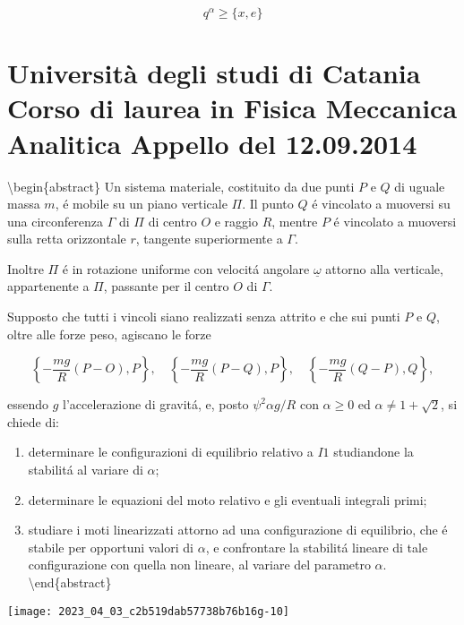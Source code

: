 \documentclass[10pt]{article}
\begin{document}
\[
q^{\alpha} \geq\{x, e\}
\]

\section*{Università degli studi di Catania 
 Corso di laurea in Fisica 
 Meccanica Analitica 
 Appello del 12.09.2014 }
\textbackslash begin\{abstract\}
Un sistema materiale, costituito da due punti \(P\) e \(Q\) di uguale massa \(m\), é mobile su un piano verticale \(\Pi\). Il punto \(Q\) é vincolato a muoversi su una circonferenza \(\Gamma\) di \(\Pi\) di centro \(O\) e raggio \(R\), mentre \(P\) é vincolato a muoversi sulla retta orizzontale \(r\), tangente superiormente a \(\Gamma\).

Inoltre \(\Pi\) é in rotazione uniforme con velocitá angolare \(\underline{\omega}\) attorno alla verticale, appartenente a \(\Pi\), passante per il centro \(O\) di \(\Gamma\).

Supposto che tutti i vincoli siano realizzati senza attrito e che sui punti \(P\) e \(Q\), oltre alle forze peso, agiscano le forze

\[
\left\{-\frac{m g}{R}(P-O), P\right\}, \quad\left\{-\frac{m g}{R}(P-Q), P\right\}, \quad\left\{-\frac{m g}{R}(Q-P), Q\right\},
\]

essendo \(g\) l'accelerazione di gravitá, e, posto \(\psi^{2} \alpha g / R\) con \(\alpha \geq 0\) ed \(\alpha \neq 1+\sqrt{2}\), si chiede di:

\begin{enumerate}
  \item determinare le configurazioni di equilibrio relativo a \(I 1\) studiandone la stabilitá al variare di \(\alpha\);

  \item determinare le equazioni del moto relativo e gli eventuali integrali primi;

  \item studiare i moti linearizzati attorno ad una configurazione di equilibrio, che é stabile per opportuni valori di \(\alpha\), e confrontare la stabilitá lineare di tale configurazione con quella non lineare, al variare del parametro \(\alpha\).
\textbackslash end\{abstract\}

\end{enumerate}

\begin{center}
\texttt{[image: 2023\_04\_03\_c2b519dab57738b76b16g-10]}
\end{center}
\end{document}
